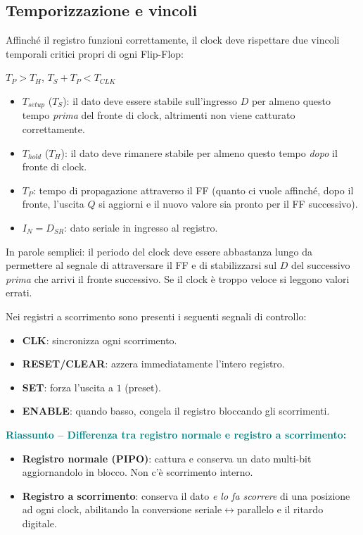 \subsection{Temporizzazione e vincoli}

Affinché il registro funzioni correttamente, il clock deve rispettare due vincoli temporali critici propri di ogni Flip-Flop:

\begin{important}
$T_P > T_H$, \quad $T_S + T_P < T_{CLK}$

\begin{itemize}[leftmargin=1.3em]
  \item $T_{setup}$ ($T_S$): il dato deve essere stabile sull'ingresso $D$ per almeno questo tempo \emph{prima} del fronte di clock, altrimenti non viene catturato correttamente.
  \item $T_{hold}$ ($T_H$): il dato deve rimanere stabile per almeno questo tempo \emph{dopo} il fronte di clock.
  \item $T_P$: tempo di propagazione attraverso il FF (quanto ci vuole affinché, dopo il fronte, l'uscita $Q$ si aggiorni e il nuovo valore sia pronto per il FF successivo).
  \item $I_N = D_{SR}$: dato seriale in ingresso al registro.
\end{itemize}
\end{important}

\noindent In parole semplici: il periodo del clock deve essere abbastanza lungo da permettere al segnale di attraversare il FF e di stabilizzarsi sul $D$ del successivo \emph{prima} che arrivi il fronte successivo. Se il clock è troppo veloce si leggono valori errati.

\medskip
\noindent Nei registri a scorrimento sono presenti i seguenti segnali di controllo:
\begin{itemize}[leftmargin=1.5em]
    \item \textbf{CLK}: sincronizza ogni scorrimento.
    \item \textbf{RESET/CLEAR}: azzera immediatamente l'intero registro.
    \item \textbf{SET}: forza l'uscita a $1$ (preset).
    \item \textbf{ENABLE}: quando basso, congela il registro bloccando gli scorrimenti.
\end{itemize}

\medskip
\noindent\textcolor{teal}{\textbf{Riassunto -- Differenza tra registro normale e registro a scorrimento:}}
\begin{itemize}[leftmargin=1.5em]
    \item \textbf{Registro normale (PIPO)}: cattura e conserva un dato multi-bit aggiornandolo in blocco. Non c'è scorrimento interno.
    \item \textbf{Registro a scorrimento}: conserva il dato \emph{e lo fa scorrere} di una posizione ad ogni clock, abilitando la conversione seriale$\leftrightarrow$parallelo e il ritardo digitale.
\end{itemize}

